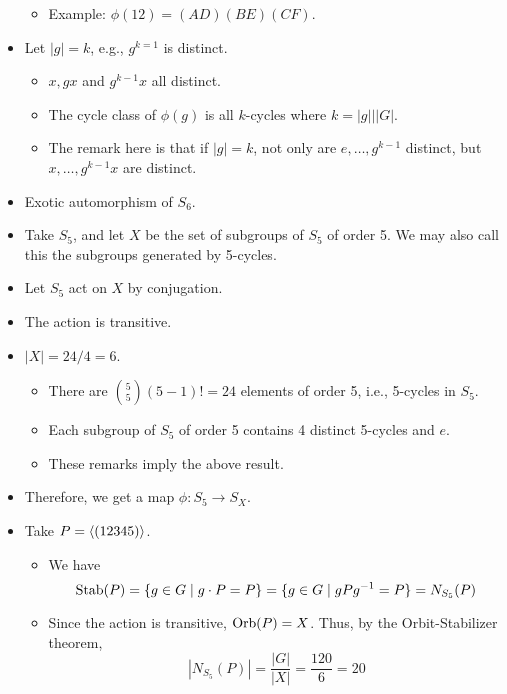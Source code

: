 \documentclass[../notes.tex]{subfiles}
\begin{document}
\begin{itemize}
\begin{itemize}
        \item Example: $\phi(12)=(AD)(BE)(CF)$.
    \end{itemize}
    \item Let $|g|=k$, e.g., $g^{k=1}$ is distinct.
    \begin{itemize}
        \item $x,gx$ and $g^{k-1}x$ all distinct.
        \item The cycle class of $\phi(g)$ is all $k$-cycles where $k=|g|\big||G|$.
        \item The remark here is that if $|g|=k$, not only are $e,\dots,g^{k-1}$ distinct, but $x,\dots,g^{k-1}x$ are distinct.
    \end{itemize}
    \item Exotic automorphism of $S_6$.
    \item Take $S_5$, and let $X$ be the set of subgroups of $S_5$ of order 5. We may also call this the subgroups generated by 5-cycles.
    \item Let $S_5$ act on $X$ by conjugation.
    \item The action is transitive.
    \item $|X|=24/4=6$.
    \begin{itemize}
        \item There are $\binom{5}{5}(5-1)!=24$ elements of order 5, i.e., 5-cycles in $S_5$.
        \item Each subgroup of $S_5$ of order 5 contains 4 distinct 5-cycles and $e$.
        \item These remarks imply the above result.
    \end{itemize}
    \item Therefore, we get a map $\phi:S_5\to S_X$.
    \item Take $P=\left\langle{(12345)}\right\rangle$.
    \begin{itemize}
        \item We have
        \begin{equation*}
            \operatorname{Stab}(P) = \{g\in G\mid g\cdot P=P\}
            = \{g\in G\mid gPg^{-1}=P\}
            = N_{S_5}(P)
        \end{equation*}
        \item Since the action is transitive, $\operatorname{Orb}(P)=X$. Thus, by the Orbit-Stabilizer theorem,
        \begin{equation*}
            |N_{S_5}(P)| = \frac{|G|}{|X|}
            = \frac{120}{6}
            = 20
        \end{equation*}
    \end{itemize}

\end{itemize}
\end{document}
